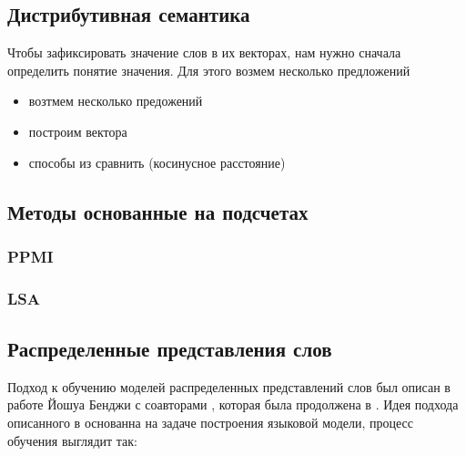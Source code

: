 \subsection{Дистрибутивная семантика}

Чтобы зафиксировать значение слов в их векторах, нам нужно сначала определить понятие значения. Для этого возмем несколько предложений

\bigskip
\begin{itemize}
 \item возтмем несколько предожений
 \item построим вектора
 \item способы из сравнить (косинусное расстояние)
\end{itemize}



\subsection{Методы основанные на подсчетах}

\subsubsection{PPMI}

\subsubsection{LSA}


\subsection{Распределенные представления слов}

Подход к обучению моделей распределенных представлений слов был описан в работе Йошуа Бенджи с соавторами \cite{Bengio}, которая была продолжена в \cite{Zhou}. Идея подхода описанного в \cite{Bengio} основанна на задаче построения языковой модели, процесс обучения выглядит так:

